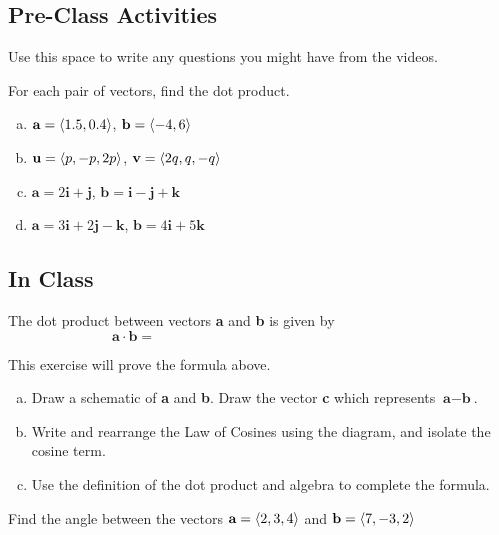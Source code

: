 \documentclass[notes]{subfiles}
\begin{document}
	\subsection*{Pre-Class Activities}
		\begin{ex}
			Use this space to write any questions you might have from the videos.	
		\end{ex}
			
		\begin{ex}
			For each pair of vectors, find the dot product.
			\begin{enumerate}[(a)]
				\item $\textbf{a} = \left\langle 1.5,0.4\right\rangle$, $\textbf{b} = \left\langle -4,6\right\rangle$
					
				\item $\textbf{u} = \left\langle p,-p,2p\right\rangle$, $\textbf{v} = \left\langle 2q,q,-q\right\rangle$
					
				\item $\textbf{a} = 2\textbf{i} + \textbf{j}$, $\textbf{b} = \textbf{i} - \textbf{j} + \textbf{k}$
					
				\item $\textbf{a} =3\textbf{i} + 2\textbf{j} - \textbf{k}$, $\textbf{b} = 4\textbf{i} + 5\textbf{k}$
			\end{enumerate}
		\end{ex}
			\newpage
			
	\subsection*{In Class}
	
		\begin{defn}
			The dot product between vectors \textbf{a} and \textbf{b} is given by \\[15pt]
				\[\textbf{a}\cdot\textbf{b} = \hspace{3in}\]
		\end{defn}
		\begin{ex}
			This exercise will prove the formula above.
			\begin{enumerate}[(a)]
				\item Draw a schematic of \textbf{a} and \textbf{b}.  Draw the vector \textbf{c} which represents $\textbf{a}-\textbf{b}$.
					\vs{1.5}
					
				\item Write and rearrange the Law of Cosines using the diagram, and isolate the cosine term.
					\vs{1}
					
				\item Use the definition of the dot product and algebra to complete the formula.
					\vs{2}
			\end{enumerate}
		\end{ex}
			\newpage
		\begin{ex}
			Find the angle between the vectors $\textbf{a} = \left\langle 2,3,4\right\rangle$ and $\textbf{b} = \left\langle 7,-3,2\right\rangle$
		\end{ex}
				
\end{document}
